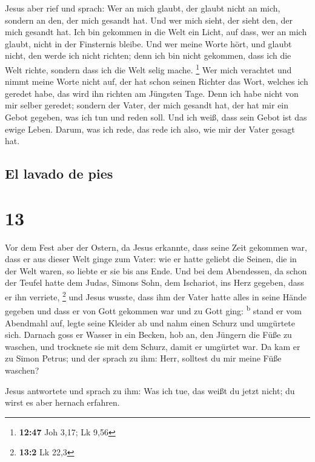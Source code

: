  Jesus aber rief und sprach: Wer an mich glaubt, der
glaubt nicht an mich, sondern an den, der mich gesandt hat.
 Und wer mich sieht, der sieht den, der mich gesandt hat.
 Ich bin gekommen in die Welt ein Licht, auf dass, wer an
mich glaubt, nicht in der Finsternis bleibe.  Und wer
meine Worte hört, und glaubt nicht, den werde ich nicht richten; denn
ich bin nicht gekommen, dass ich die Welt richte, sondern dass ich die
Welt selig mache. \footnote{\textbf{12:47} Joh 3,17; Lk 9,56}
 Wer mich verachtet und nimmt meine Worte nicht auf, der
hat schon seinen Richter das Wort, welches ich geredet habe, das wird
ihn richten am Jüngsten Tage.  Denn ich habe nicht von
mir selber geredet; sondern der Vater, der mich gesandt hat, der hat mir
ein Gebot gegeben, was ich tun und reden soll.  Und ich
weiß, dass sein Gebot ist das ewige Leben. Darum, was ich rede, das rede
ich also, wie mir der Vater gesagt hat.

\hypertarget{el-lavado-de-pies}{%
\subsection{El lavado de pies}\label{el-lavado-de-pies}}

\hypertarget{section-12}{%
\section{13}\label{section-12}}

 Vor dem Fest aber der Ostern, da Jesus erkannte, dass
seine Zeit gekommen war, dass er aus dieser Welt ginge zum Vater: wie er
hatte geliebt die Seinen, die in der Welt waren, so liebte er sie bis
ans Ende.  Und bei dem Abendessen, da schon der Teufel
hatte dem Judas, Simons Sohn, dem Ischariot, ins Herz gegeben, dass er
ihn verriete, \footnote{\textbf{13:2} Lk 22,3}  und Jesus
wusste, dass ihm der Vater hatte alles in seine Hände gegeben und dass
er von Gott gekommen war und zu Gott ging: \textsuperscript{b}
 stand er vom Abendmahl auf, legte seine Kleider ab und
nahm einen Schurz und umgürtete sich.  Darnach goss er
Wasser in ein Becken, hob an, den Jüngern die Füße zu waschen, und
trocknete sie mit dem Schurz, damit er umgürtet war.  Da
kam er zu Simon Petrus; und der sprach zu ihm: Herr, solltest du mir
meine Füße waschen?

 Jesus antwortete und sprach zu ihm: Was ich tue, das
weißt du jetzt nicht; du wirst es aber hernach erfahren.

